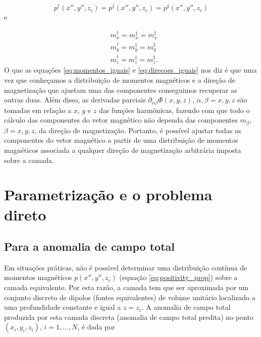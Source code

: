 \begin{equation}
p^{\dagger}(x'', y'', z_{c}) = p^{\ddagger}(x'', y'', z_{c}) = p^{\sharp}(x'', y'', z_{c})
\label{eq:momentos_iguais}
\end{equation}
e 

\begin{equation}
\begin{split}
&m_{x}^{\dagger} = m_{x}^{\ddagger} = m_{x}^{\sharp} 
\\
&m_{y}^{\dagger} = m_{y}^{\ddagger} = m_{y}^{\sharp} 
\\
&m_{z}^{\dagger} = m_{z}^{\ddagger} = m_{z}^{\sharp}.
\end{split}
\label{eq:direcoes_iguais}
\end{equation}
O que as equações \ref{eq:momentos_iguais} e \ref{eq:direcoes_iguais} nos diz é que uma vez que conheçamos a distribuição de momentos magnéticos e a direção de magnetização que ajustam uma das componentes conseguimos recuperar as outras duas. Além disso, as derivadas parciais $\partial_{\alpha\beta} \Phi(x, y, z)$, $\alpha, \beta = x, y, z$ são tomadas em relação a $x$, $y$ e $z$ das funções harmônicas, fazendo com que todo o cálculo das componentes do vetor magnético não dependa das componentes $m_\beta$, $\beta = x,y,z$, da direção de magnetização. Portanto, é possível ajustar todas as componentes do vetor magnético a partir de uma distribuição de momentos magnéticos associada a qualquer direção de magnetização arbitrária imposta sobre a camada.  
 
\section{Parametrização e o problema direto}
\label{sec:par_prob_dir}

\subsection{Para a anomalia de campo total}
\label{subsec:tf_prob_dir}

Em situações práticas, não é possível determinar uma distribuição contínua de momentos magnéticos $p(x'',y'',z_{c})$ (equação \ref{eq:positivity_prop}) sobre a camada equivalente. Por esta razão, a camada tem que ser aproximada por um conjunto discreto de dipolos (fontes equivalentes) de volume unitário localizado a uma profundidade constante e igual a $z = z_c$. A anomalia de campo total produzida por esta camada discreta (anomalia de campo total predita) no ponto $(x_i,y_i,z_i)$, $i=1,\dots,N$, é dada por 

